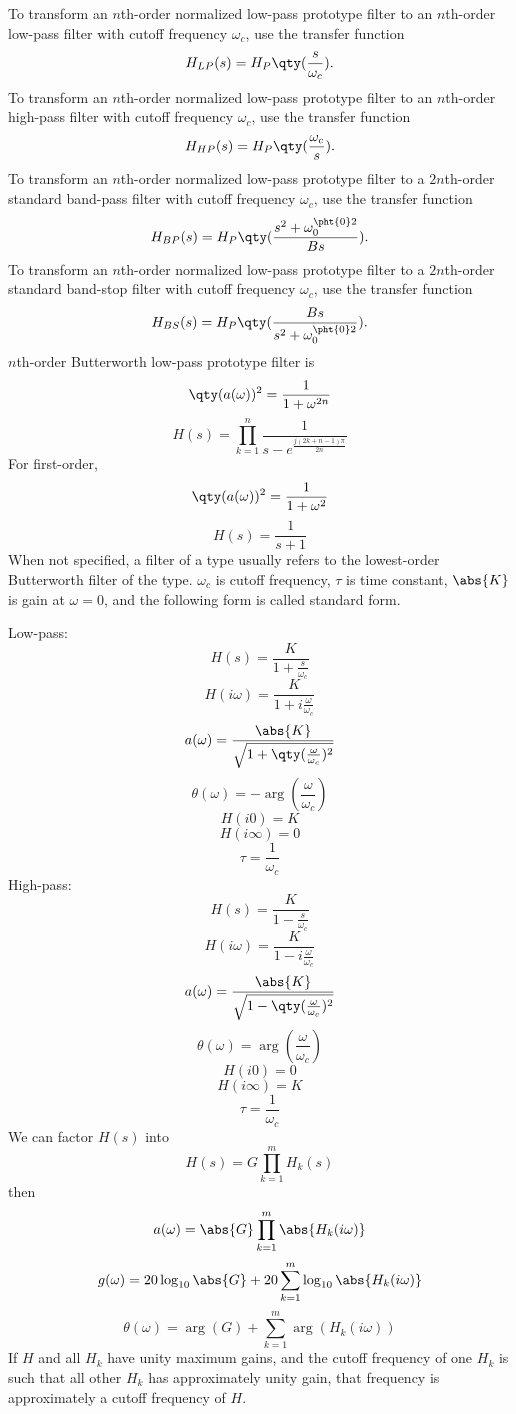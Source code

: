 \documentclass[a4paper,12pt]{report}
\begin{document}
To transform an $n$th-order normalized low-pass prototype filter to an $n$th-order low-pass filter with cutoff frequency $\omega_c$, use the transfer function
\[H_{LP}(s)=H_P\qty(\frac{s}{\omega_c}).\]
To transform an $n$th-order normalized low-pass prototype filter to an $n$th-order high-pass filter with cutoff frequency $\omega_c$, use the transfer function
\[H_{HP}(s)=H_P\qty(\frac{\omega_c}{s}).\]
To transform an $n$th-order normalized low-pass prototype filter to a $2n$th-order standard band-pass filter with cutoff frequency $\omega_c$, use the transfer function
\[H_{BP}(s)=H_P\qty(\frac{s^2+\omega_0^{\pht{0}2}}{Bs}).\]
To transform an $n$th-order normalized low-pass prototype filter to a $2n$th-order standard band-stop filter with cutoff frequency $\omega_c$, use the transfer function
\[H_{BS}(s)=H_P\qty(\frac{Bs}{s^2+\omega_0^{\pht{0}2}}).\]
$n$th-order Butterworth low-pass prototype filter is
\[\qty(a(\omega))^2=\frac{1}{1+\omega^{2n}}\]
\[H(s)=\prod_{k=1}^n\frac{1}{s-e^{\frac{j(2k+n-1)\pi}{2n}}}\]
For first-order,
\[\qty(a(\omega))^2=\frac{1}{1+\omega^2}\]
\[H(s)=\frac{1}{s+1}\]
When not specified, a filter of a type usually refers to the lowest-order Butterworth filter of the type.
$\omega_c$ is cutoff frequency, $\tau$ is time constant, $\abs{K}$ is gain at $\omega=0$, and the following form is called standard form.

Low-pass:
\[H(s)=\frac{K}{1+\frac{s}{\omega_c}}\]
\[H(i\omega)=\frac{K}{1+i\frac{\omega}{\omega_c}}\]
\[a(\omega)=\frac{\abs{K}}{\sqrt{1+\qty(\frac{\omega}{\omega_c})^2}}\]
\[\theta(\omega)=-\arg(\frac{\omega}{\omega_c})\]
\[H(i0)=K\]
\[H(i\infty)=0\]
\[\tau=\frac{1}{\omega_c}\]
High-pass:
\[H(s)=\frac{K}{1-\frac{s}{\omega_c}}\]
\[H(i\omega)=\frac{K}{1-i\frac{\omega}{\omega_c}}\]
\[a(\omega)=\frac{\abs{K}}{\sqrt{1-\qty(\frac{\omega}{\omega_c})^2}}\]
\[\theta(\omega)=\arg(\frac{\omega}{\omega_c})\]
\[H(i0)=0\]
\[H(i\infty)=K\]
\[\tau=\frac{1}{\omega_c}\]
We can factor $H(s)$ into
\[H(s)=G\prod_{k=1}^mH_k(s)\]
then
\[a(\omega)=\abs{G}\prod_{k=1}^m\abs{H_k(i\omega)}\]
\[g(\omega)=20\log_{10}\abs{G}+20\sum_{k=1}^m\log_{10}\abs{H_k(i\omega)}\]
\[\theta(\omega)=\arg(G)+\sum_{k=1}^m\arg(H_k(i\omega))\]
If $H$ and all $H_k$ have unity maximum gains, and the cutoff frequency of one $H_k$ is such that all other $H_k$ has approximately unity gain, that frequency is approximately a cutoff frequency of $H$.
\end{document}
